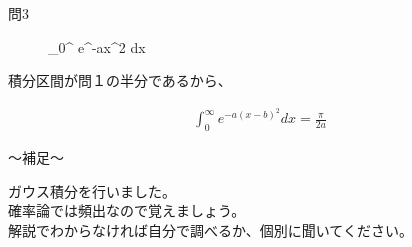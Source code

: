 \documentclass[12pt,a4paper]{jsarticle}
\begin{document}
\begin{description}
    \item [問3] {\displaystyle} \int_0^{\infty} e^{-ax^2} dx
\end{description}

積分区間が問１の半分であるから、

\begin{align*}
    \int_0^{\infty} e^{-a(x-b)^2} dx = \frac{\pi}{2a}
\end{align*}

\begin{boxnote}
    〜補足〜
    \begin{center}
        ガウス積分を行いました。\\
        確率論では頻出なので覚えましょう。\\
        解説でわからなければ自分で調べるか、個別に聞いてください。
    \end{center}
\end{boxnote}
\end{document}
